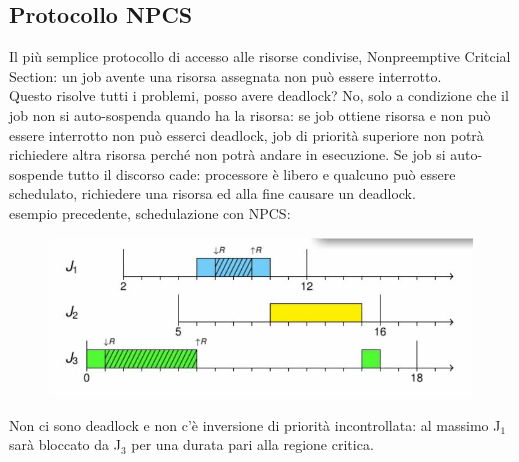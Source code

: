 \documentclass[12pt, oneside]{extbook}
\begin{document}
\subsection{Protocollo NPCS}
Il più semplice protocollo di accesso alle risorse condivise, Nonpreemptive Critcial Section: un job avente una risorsa assegnata non può essere interrotto.\\ Questo risolve tutti i problemi, posso avere deadlock? No, solo a condizione che il job non si auto-sospenda quando ha la risorsa: se job ottiene risorsa e non può essere interrotto non può esserci deadlock, job di priorità superiore non potrà richiedere altra risorsa perché non potrà andare in esecuzione. Se job si auto-sospende tutto il discorso cade: processore è libero e qualcuno può essere schedulato, richiedere una risorsa ed alla fine causare un deadlock.\\ esempio precedente,  schedulazione con NPCS:\\
\begin{figure}[!h]
\centering
\includegraphics[scale=0.4]{immagini/image-022.jpg}
\end{figure}
Non ci sono deadlock e non c'è inversione di priorità incontrollata: al massimo J$_{1}$ sarà bloccato da J$_{3}$ per una durata pari alla regione critica.
\end{document}
